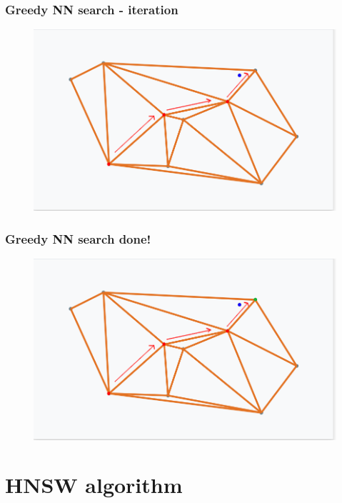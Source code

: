 \documentclass{beamer}
\begin{document}
  \begin{frame}
    \frametitle{Greedy NN search - iteration}  
  \begin{figure}[greedy_search_start_new_step_3_1]
    \vspace*{-0.1cm}
  	\includegraphics[scale=0.3]{greedy_search_start_new_step_3_1} 	
  \end{figure} 
  \end{frame}         


  \begin{frame}
    \frametitle{Greedy NN search done!}  
  \begin{figure}[greedy_search_start_new_step_3_2]
    \vspace*{-0.1cm}
  	\includegraphics[scale=0.3]{greedy_search_start_new_step_3_2} 	
  \end{figure} 
  \end{frame}         

\section{HNSW algorithm}
\end{document}
